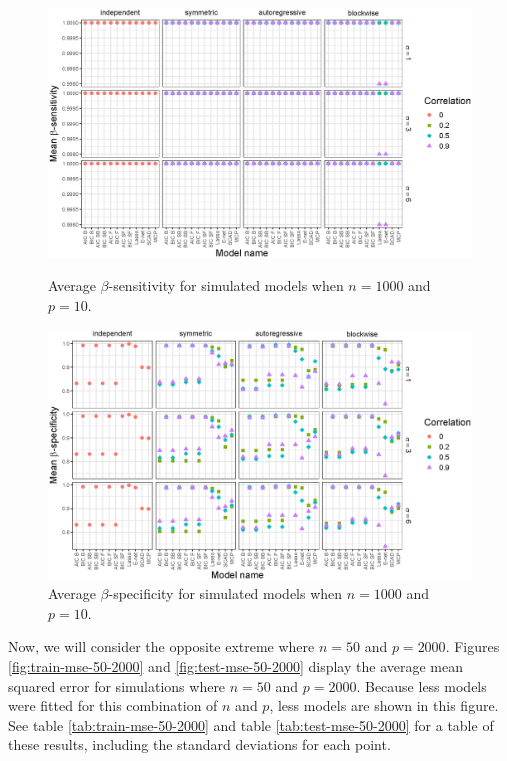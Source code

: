 \documentclass{article}
\begin{document}
\begin{figure}[p!]
	\centering
	\includegraphics[width = \textwidth]{images/facet-sensitivity/facet_sensitivity_1000_10.eps}
	\captionsetup{width = 0.8\textwidth}
	\caption{Average $\beta$-sensitivity for simulated models when $n = 1000$ and $p = 10$.}
	\label{fig:sensitivity-1000-10}
	
	\bigskip
	
	\includegraphics[width = \textwidth]{images/facet-specificity/facet_specificity_1000_10.eps}
	\captionsetup{width = 0.8\textwidth}
	\caption{Average $\beta$-specificity for simulated models when $n = 1000$ and $p = 10$.}
	\label{fig:specificity-1000-10}
\end{figure}

Now, we will consider the opposite extreme where $n = 50$ and $p = 2000$. Figures \ref{fig:train-mse-50-2000} and \ref{fig:test-mse-50-2000} display the average mean squared error for simulations where $n = 50$ and $p = 2000$. Because less models were fitted for this combination of $n$ and $p$, less models are shown in this figure. See table \ref{tab:train-mse-50-2000} and table \ref{tab:test-mse-50-2000} for a table of these results, including the standard deviations for each point.
\end{document}
